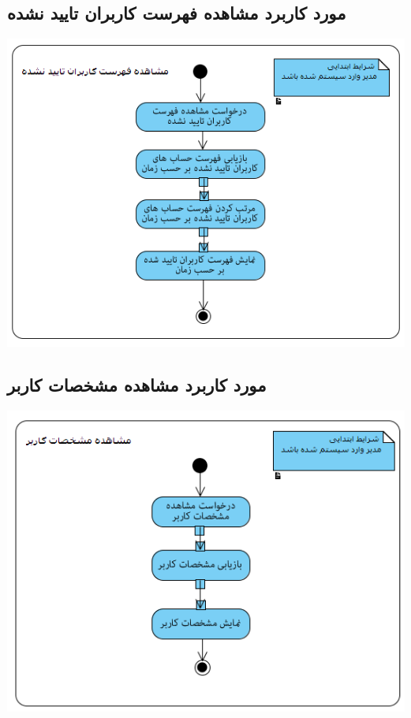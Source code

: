 \documentclass{article}
\begin{document}
\newpage
\vspace{2cm}
\subsection*{مورد کاربرد مشاهده فهرست کاربران تایید نشده}
\vspace{2cm}
\begin{center}
\includegraphics[width=\textwidth]{ActivityDiagrams/3.png}
\end{center}

\newpage
\vspace{2cm}
\subsection*{مورد کاربرد مشاهده مشخصات کاربر}
\vspace{2cm}
\begin{center}
\includegraphics[width=\textwidth]{ActivityDiagrams/4.png}
\end{center}
\end{document}
